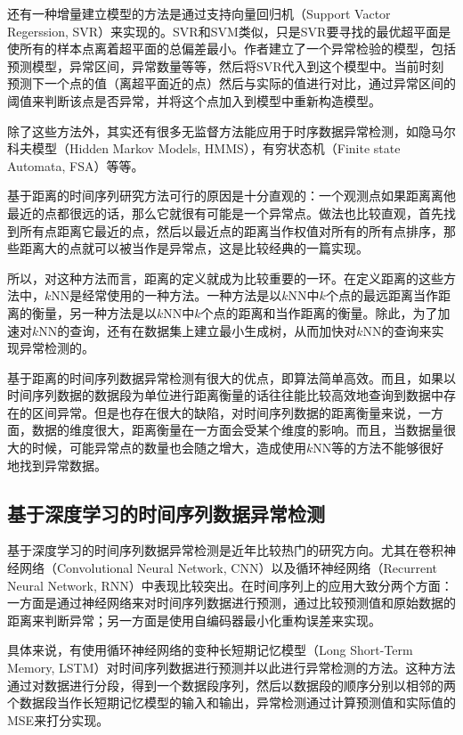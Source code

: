 还有一种增量建立模型的方法是通过支持向量回归机（Support Vactor Regerssion, SVR）来实现的\cite{ma2003online}。SVR和SVM类似，只是SVR要寻找的最优超平面是使所有的样本点离着超平面的总偏差最小。作者建立了一个异常检验的模型，包括预测模型，异常区间，异常数量等等，然后将SVR代入到这个模型中。当前时刻预测下一个点的值（离超平面近的点）然后与实际的值进行对比，通过异常区间的阈值来判断该点是否异常，并将这个点加入到模型中重新构造模型。

除了这些方法外，其实还有很多无监督方法能应用于时序数据异常检测，如隐马尔科夫模型（Hidden Markov Models, HMMS）\cite{florez2005efficient}，有穷状态机（Finite state Automata, FSA）\cite{chandola2008comparative}等等。

基于距离的时间序列研究方法可行的原因是十分直观的：一个观测点如果距离离他最近的点都很远的话，那么它就很有可能是一个异常点。做法也比较直观，首先找到所有点距离它最近的点，然后以最近点的距离当作权值对所有的所有点排序，那些距离大的点就可以被当作是异常点，这是比较经典的一篇实现\cite{huang2013rank}。

所以，对这种方法而言，距离的定义就成为比较重要的一环。在定义距离的这些方法中，$k$NN是经常使用的一种方法。一种方法是以$k$NN中$k$个点的最远距离当作距离的衡量\cite{ramaswamy2000efficient}，另一种方法是以$k$NN中$k$个点的距离和当作距离的衡量\cite{angiulli2002fast}。除此，为了加速对$k$NN的查询，还有在数据集上建立最小生成树，从而加快对$k$NN的查询来实现异常检测的\cite{wang2015fast}。

基于距离的时间序列数据异常检测有很大的优点，即算法简单高效。而且，如果以时间序列数据的数据段为单位进行距离衡量的话往往能比较高效地查询到数据中存在的区间异常。但是也存在很大的缺陷，对时间序列数据的距离衡量来说，一方面，数据的维度很大，距离衡量在一方面会受某个维度的影响。而且，当数据量很大的时候，可能异常点的数量也会随之增大，造成使用$k$NN等的方法不能够很好地找到异常数据\cite{aggarwal2015outlier}。

\subsection{基于深度学习的时间序列数据异常检测}

基于深度学习的时间序列数据异常检测是近年比较热门的研究方向。尤其在卷积神经网络（Convolutional Neural Network, CNN）以及循环神经网络（Recurrent Neural Network, RNN）中表现比较突出。在时间序列上的应用大致分两个方面：一方面是通过神经网络来对时间序列数据进行预测，通过比较预测值和原始数据的距离来判断异常；另一方面是使用自编码器最小化重构误差\cite{srivastava2015unsupervised}来实现。

具体来说，有使用循环神经网络的变种长短期记忆模型（Long Short-Term Memory, LSTM）对时间序列数据进行预测并以此进行异常检测的方法\cite{filonov2016multivariate}。这种方法通过对数据进行分段，得到一个数据段序列，然后以数据段的顺序分别以相邻的两个数据段当作长短期记忆模型的输入和输出，异常检测通过计算预测值和实际值的MSE来打分实现。

